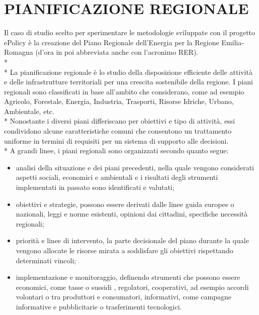 \documentclass[12pt,a4paper,openright,twoside]{report}
\begin{document}
\section{PIANIFICAZIONE REGIONALE}

Il caso di studio scelto per sperimentare le metodologie sviluppate con il progetto ePolicy è la creazione del Piano Regionale dell'Energia per la Regione Emilia-Romagna (d'ora in poi abbreviata anche con l'acronimo RER).\\*\\*
La pianificazione regionale è lo studio della disposizione efficiente delle attività e delle infrastrutture territoriali per una crescita sostenibile della regione. I piani regionali sono classificati in base all'ambito che considerano, come ad esempio Agricolo, Forestale, Energia, Industria, Trasporti, Risorse Idriche, Urbano, Ambientale, etc.\\*
Nonostante i diversi piani differiscano per obiettivi e tipo di attività, essi condividono alcune caratteristiche comuni che consentono un trattamento uniforme in termini di requisiti per un sistema di supporto alle decisioni.\\*
A grandi linee, i piani regionali sono organizzati secondo quanto segue: \begin{itemize}
\item analisi della situazione e dei piani precedenti, nella quale vengono considerati aspetti sociali, economici e ambientali e i risultati degli strumenti implementati in passato sono identificati e valutati;
\item obiettivi e strategie, possono essere derivati dalle linee guida europee o nazionali, leggi e norme esistenti, opinioni dai cittadini, specifiche necessità regionali;
\item priorità e linee di intervento, la parte decisionale del piano durante la quale vengono allocate le risorse mirata a soddisfare gli obiettivi rispettando determinati vincoli;
\item implementazione e monitoraggio, definendo strumenti che possono essere economici, come tasse o sussidi , regolatori, cooperativi, ad esempio accordi volontari o tra produttori e consumatori, informativi, come campagne informative e pubblicitarie o trasferimenti tecnologici.   
\end{itemize}
\end{document}
